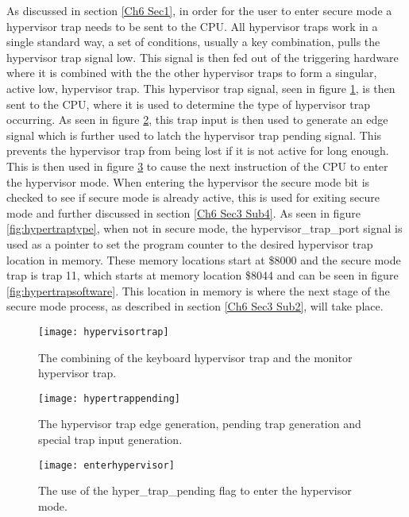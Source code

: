 As discussed in section \ref{Ch6 Sec1}, in order for the user to enter secure mode a hypervisor trap needs to be sent to the CPU. All hypervisor traps work in a single standard way, a set of conditions, usually a key combination, pulls the hypervisor trap signal low. This signal is then fed out of the triggering hardware where it is combined with the the other hypervisor traps to form a singular, active low, hypervisor trap. This hypervisor trap signal, seen in figure \ref{fig:hypervisortrap}, is then sent to the CPU, where it is used to determine the type of hypervisor trap occurring. As seen in figure \ref{fig:hypertrappending}, this trap input is then used to generate an edge signal which is further used to latch the hypervisor trap pending signal. This prevents the hypervisor trap from being lost if it is not active for long enough. This is then used in figure \ref{fig:enterhypervisor} to cause the next instruction of the CPU to enter the hypervisor mode. When entering the hypervisor the secure mode bit is checked to see if secure mode is already active, this is used for exiting secure mode and further discussed in section \ref{Ch6 Sec3 Sub4}. As seen in figure \ref{fig:hypertraptype}, when not in secure mode, the hypervisor\_trap\_port signal is used as a pointer to set the program counter to the desired hypervisor trap location in memory. These memory locations start at \$8000 and the secure mode trap is trap 11, which starts at memory location \$8044 and can be seen in figure \ref{fig:hypertrapsoftware}. This location in memory is where the next stage of the secure mode process, as described in section \ref{Ch6 Sec3 Sub2}, will take place.

\begin{figure}
  \centering
  \texttt{[image: hypervisortrap]}
  \caption{The combining of the keyboard hypervisor trap and the monitor hypervisor trap.}
  \label{fig:hypervisortrap}
\end{figure}

\begin{figure}
  \centering
  \texttt{[image: hypertrappending]}
  \caption{The hypervisor trap edge generation, pending trap generation and special trap input generation.}
  \label{fig:hypertrappending}
\end{figure}

\begin{figure}
  \centering
  \texttt{[image: enterhypervisor]}
  \caption{The use of the hyper\_trap\_pending flag to enter the hypervisor mode.}
  \label{fig:enterhypervisor}
\end{figure}

